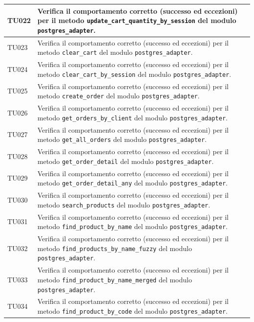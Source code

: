 \documentclass[a4paper,11pt,oneside]{scrartcl}
\begin{document}
\begin{longtable}{|p{1.9cm}|p{11.6cm}|c|}
TU022 & Verifica il comportamento corretto (successo ed eccezioni) per il metodo \texttt{update\_cart\_quantity\_by\_session} del modulo \texttt{postgres\_adapter}. & \\ \hline
TU023 & Verifica il comportamento corretto (successo ed eccezioni) per il metodo \texttt{clear\_cart} del modulo \texttt{postgres\_adapter}. & \\ \hline
TU024 & Verifica il comportamento corretto (successo ed eccezioni) per il metodo \texttt{clear\_cart\_by\_session} del modulo \texttt{postgres\_adapter}. & \\ \hline
TU025 & Verifica il comportamento corretto (successo ed eccezioni) per il metodo \texttt{create\_order} del modulo \texttt{postgres\_adapter}. & \\ \hline
TU026 & Verifica il comportamento corretto (successo ed eccezioni) per il metodo \texttt{get\_orders\_by\_client} del modulo \texttt{postgres\_adapter}. & \\ \hline
TU027 & Verifica il comportamento corretto (successo ed eccezioni) per il metodo \texttt{get\_all\_orders} del modulo \texttt{postgres\_adapter}. & \\ \hline
TU028 & Verifica il comportamento corretto (successo ed eccezioni) per il metodo \texttt{get\_order\_detail} del modulo \texttt{postgres\_adapter}. & \\ \hline
TU029 & Verifica il comportamento corretto (successo ed eccezioni) per il metodo \texttt{get\_order\_detail\_any} del modulo \texttt{postgres\_adapter}. & \\ \hline
TU030 & Verifica il comportamento corretto (successo ed eccezioni) per il metodo \texttt{search\_products} del modulo \texttt{postgres\_adapter}. & \\ \hline
TU031 & Verifica il comportamento corretto (successo ed eccezioni) per il metodo \texttt{find\_product\_by\_name} del modulo \texttt{postgres\_adapter}. & \\ \hline
TU032 & Verifica il comportamento corretto (successo ed eccezioni) per il metodo \texttt{find\_products\_by\_name\_fuzzy} del modulo \texttt{postgres\_adapter}. & \\ \hline
TU033 & Verifica il comportamento corretto (successo ed eccezioni) per il metodo \texttt{find\_product\_by\_name\_merged} del modulo \texttt{postgres\_adapter}. & \\ \hline
TU034 & Verifica il comportamento corretto (successo ed eccezioni) per il metodo \texttt{find\_product\_by\_code} del modulo \texttt{postgres\_adapter}. & \\ \hline

\end{longtable}
\end{document}
